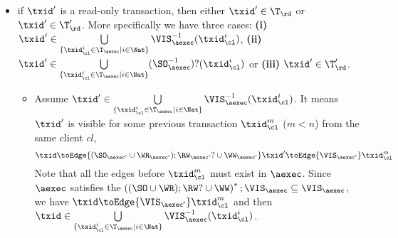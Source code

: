 \begin{itemize}
\begin{itemize}
\begin{itemize}
        Recall the \( \ddagger \) is defined as the following:
        \begin{equation}
        \label{equ:cp-dagger}
        \ddagger  \equiv 
            \fora{\ke, \ke', i, j}
                i \in \vi(\ke)  \wedge \WTx(\hh(\ke', j)) \toEdge{(((\PO \cup \RF_{\hh}) ; \AD_{\hh}?) \cup \VO_{\hh})^{+}} \WTx(\hh(\ke, i))
            \implies j \in \vi(\ke')  
        \end{equation}
        Since \( \WR_\mkvs \), \( \WW_\mkvs \) and \( \RW_\mkvs \) coincide with
        \( \WR_\aexec \), \( \WW_\aexec \) and \( \RW_\aexec \) respectively.
        Also because \( \txid \) write to at least one key,
        it is easy to see there exists some version \( \ke'',m\) such that 
        \( \txid = \WTx(\mkvs(\ke'',m))\) and \( m \in \vi(\ke'')\).
        By definition of \( \Tx \), it follows \( \txid \in \Tx(\mkvs, \vi) \).
        \item if \( \txid \) is a read-only transaction, we add it into \( \T'_\rd \).
    \end{itemize}
    \item 
    if \( \txid' \) is a read-only transaction, then either \( \txid' \in \T_\rd \) or \( \txid' \in \T'_\rd \).
    More specifically we have three cases: \textbf{(i)} \( \txid' \in \bigcup\limits_{\{\txid_{\cl}^{i} \in \T_{\aexec} \mid i \in \Nat\}} \VIS_{\aexec}^{-1}(\txid^i_\cl) \), \textbf{(ii)} \( \txid' \in \bigcup\limits_{\{\txid_{\cl}^{i} \in \T_{\aexec} \mid i \in \Nat\}} (\SO_{\aexec}^{-1})?(\txid^i_\cl) \) or \textbf{(iii)} \( \txid' \in \T'_\rd\).
    \begin{itemize}
        \item
        Assume \( \txid' \in \bigcup\limits_{\{\txid_{\cl}^{i} \in \T_{\aexec} \mid i \in \Nat\}} \VIS_{\aexec}^{-1}(\txid^i_\cl) \).
        It means \( \txid' \) is visible for some previous transaction \( \txid_\cl^m \) (\( m < n \)) from the same client \( cl \), 
        \ie 
        \[ 
            \txid \toEdge{(\SO_{\aexec'} \cup \WR_{\aexec'} ) ; \RW_{\aexec'}? \cup \WW_{\aexec'}} \txid' \toEdge{\VIS_{\aexec'}}  \txid_\cl^m 
        \]
        Note that all the edges before \( \txid_\cl^m \) must exist in \( \aexec \).
        Since \( \aexec \) satisfies the \( \left( (\SO \cup \WR ) ; \RW? \cup \WW \right)^* ; \VIS_\aexec \subseteq \VIS_\aexec \),
        we have \( \txid \toEdge{\VIS_{\aexec'}} \txid_\cl^m \) and then \( \txid \in \bigcup\limits_{\{\txid_{\cl}^{i} \in \T_{\aexec} \mid i \in \Nat\}} \VIS_{\aexec}^{-1}(\txid^i_\cl)\).

\end{itemize}
\end{itemize}
\end{itemize}
